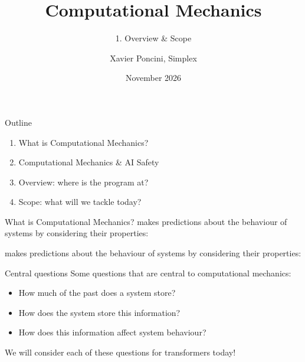 \documentclass[aspectratio=169,12pt,t]{beamer}
\title{Computational Mechanics}
\subtitle{1. Overview \& Scope}
\institute{ILIAD Intensive}
\date{November 2026}
\author{Xavier Poncini, Simplex}
\begin{document}
\iliadtitle

\begin{frame}{Outline}
  \vspace{5mm}
  \begin{enumerate}
    \setlength{\itemsep}{4mm}
    \item What is Computational Mechanics?
    \item Computational Mechanics \& AI Safety
    \item Overview: where is the program at?
    \item Scope: what will we tackle today?
  \end{enumerate}
\end{frame}

\begin{frame}{What is Computational Mechanics?}
  \begingroup\small
   makes predictions about the behaviour of
  systems by considering their  properties:\par\endgroup
  \vspace{-1mm}
  \begin{center}\end{center}
  \vspace{-2mm}
  {\small
   makes predictions about the behaviour of
  systems by considering their  properties:\par}
  \vspace{-1mm}
  \begin{center}\end{center}
\end{frame}

\begin{frame}{Central questions}
  Some questions that are central to computational mechanics:
  \vspace{3mm}

  \begin{itemize}
    \setlength{\itemsep}{2mm}
    \item How much of the past does a system store?
    \item How does the system store this information?
    \item How does this information affect system behaviour?
  \end{itemize}
  \vspace{4mm}

  We will consider each of these questions for transformers today!
\end{frame}
\end{document}
